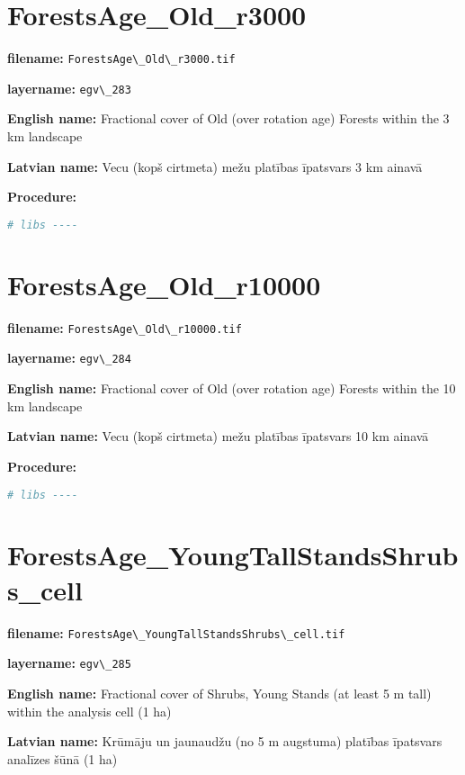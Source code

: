 \documentclass[
]{book}
\newcommand{\passthrough}[1]{#1}
\begin{document}
\section{ForestsAge\_Old\_r3000}\label{ch06.283}

\textbf{filename:} \passthrough{\lstinline!ForestsAge\_Old\_r3000.tif!}

\textbf{layername:} \passthrough{\lstinline!egv\_283!}

\textbf{English name:} Fractional cover of Old (over rotation age) Forests within the 3 km landscape

\textbf{Latvian name:} Vecu (kopš cirtmeta) mežu platības īpatsvars 3 km ainavā

\textbf{Procedure:}

\begin{lstlisting}[language=R]
# libs ----
\end{lstlisting}

\section{ForestsAge\_Old\_r10000}\label{ch06.284}

\textbf{filename:} \passthrough{\lstinline!ForestsAge\_Old\_r10000.tif!}

\textbf{layername:} \passthrough{\lstinline!egv\_284!}

\textbf{English name:} Fractional cover of Old (over rotation age) Forests within the 10 km landscape

\textbf{Latvian name:} Vecu (kopš cirtmeta) mežu platības īpatsvars 10 km ainavā

\textbf{Procedure:}

\begin{lstlisting}[language=R]
# libs ----
\end{lstlisting}

\section{ForestsAge\_YoungTallStandsShrubs\_cell}\label{ch06.285}

\textbf{filename:} \passthrough{\lstinline!ForestsAge\_YoungTallStandsShrubs\_cell.tif!}

\textbf{layername:} \passthrough{\lstinline!egv\_285!}

\textbf{English name:} Fractional cover of Shrubs, Young Stands (at least 5 m tall) within the analysis cell (1 ha)

\textbf{Latvian name:} Krūmāju un jaunaudžu (no 5 m augstuma) platības īpatsvars analīzes šūnā (1 ha)
\end{document}
